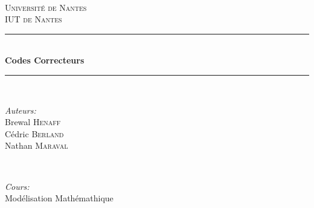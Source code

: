 \documentclass[12pt]{article}
\begin{document}
\begin{titlepage}

\newcommand{\HRule}{\rule{\linewidth}{0.5mm}} %

\center %


\textsc{\LARGE }\\[1.5cm] %
\textsc{\Large Université de Nantes}\\[0.5cm] %
\textsc{\large IUT de Nantes}\\[0.5cm] %


\HRule \\[0.4cm]
{ \huge \bfseries Codes Correcteurs}\\[0.4cm] %
\HRule \\[1.5cm]


\begin{minipage}{0.4\textwidth}
\begin{flushleft} \large
\emph{Auteurs:}\\
Brewal \textsc{Henaff}\\
Cédric \textsc{Berland}\\
Nathan \textsc{Maraval}
\end{flushleft}
\end{minipage}
~
\begin{minipage}{0.4\textwidth}
\begin{flushright} \large
\emph{Cours:} \\
Modélisation Mathémathique %
\end{flushright}
\end{minipage}\\[3cm]



\end{titlepage}
\end{document}
